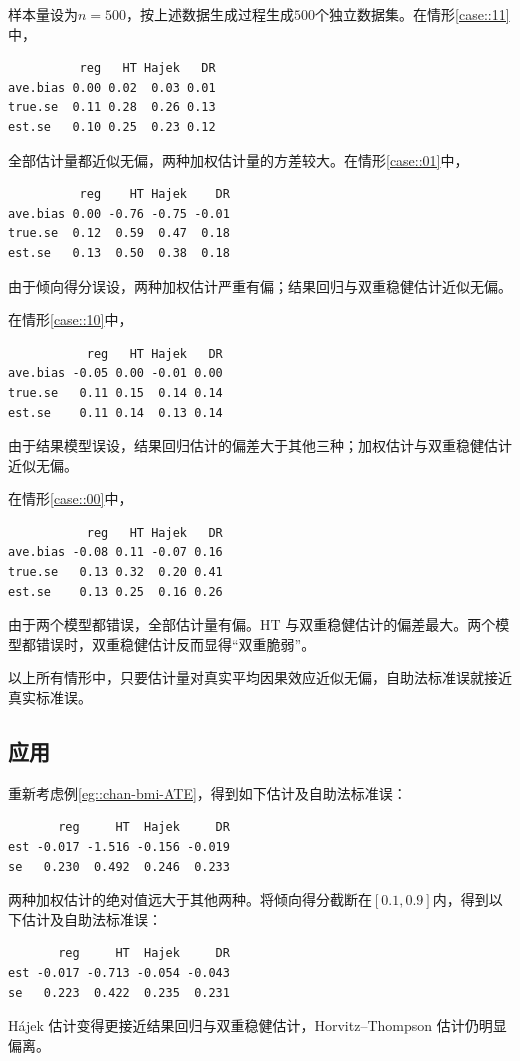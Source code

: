样本量设为$n=500$，按上述数据生成过程生成$500$个独立数据集。在情形\ref{case::11}中， 
\begin{lstlisting}
          reg   HT Hajek   DR
ave.bias 0.00 0.02  0.03 0.01
true.se  0.11 0.28  0.26 0.13
est.se   0.10 0.25  0.23 0.12
\end{lstlisting}
全部估计量都近似无偏，两种加权估计量的方差较大。在情形\ref{case::01}中，
\begin{lstlisting}
          reg    HT Hajek    DR
ave.bias 0.00 -0.76 -0.75 -0.01
true.se  0.12  0.59  0.47  0.18
est.se   0.13  0.50  0.38  0.18
\end{lstlisting}
由于倾向得分误设，两种加权估计严重有偏；结果回归与双重稳健估计近似无偏。 


在情形\ref{case::10}中，
\begin{lstlisting}
           reg   HT Hajek   DR
ave.bias -0.05 0.00 -0.01 0.00
true.se   0.11 0.15  0.14 0.14
est.se    0.11 0.14  0.13 0.14
\end{lstlisting}
由于结果模型误设，结果回归估计的偏差大于其他三种；加权估计与双重稳健估计近似无偏。 


在情形\ref{case::00}中，
\begin{lstlisting}
           reg   HT Hajek   DR
ave.bias -0.08 0.11 -0.07 0.16
true.se   0.13 0.32  0.20 0.41
est.se    0.13 0.25  0.16 0.26
\end{lstlisting}
由于两个模型都错误，全部估计量有偏。HT 与双重稳健估计的偏差最大。两个模型都错误时，双重稳健估计反而显得“双重脆弱”。 


以上所有情形中，只要估计量对真实平均因果效应近似无偏，自助法标准误就接近真实标准误。 




\subsection{应用}
\label{sec::ATE-application}




重新考虑例\ref{eg::chan-bmi-ATE}，得到如下估计及自助法标准误：
\begin{lstlisting}
       reg     HT  Hajek     DR
est -0.017 -1.516 -0.156 -0.019
se   0.230  0.492  0.246  0.233
\end{lstlisting}
两种加权估计的绝对值远大于其他两种。将倾向得分截断在$[0.1, 0.9]$内，得到以下估计及自助法标准误：
\begin{lstlisting}
       reg     HT  Hajek     DR
est -0.017 -0.713 -0.054 -0.043
se   0.223  0.422  0.235  0.231
\end{lstlisting}
Hájek 估计变得更接近结果回归与双重稳健估计，Horvitz--Thompson 估计仍明显偏离。 



